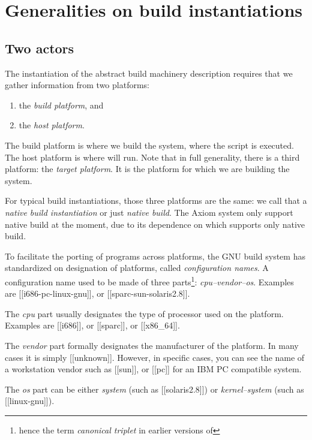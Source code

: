 \documentclass[12pt]{article}
\begin{document}
\section{Generalities on build instantiations}

\subsection{Two actors}

The instantiation of the abstract build machinery description requires
that we gather information from two platforms:
\begin{enumerate}
\item the \emph{build platform}, and
\item the \emph{host platform}.
\end{enumerate}

The build platform is where we build the system, \eg{} where
the  script is executed.  The host platform
is where  will run.  Note that in full generality, there is
a third platform: the \emph{target platform}.  It is the platform for which
we are building the system.

For typical build instantiations, those  three  platforms are the same: we
call that a \emph{native build instantiation} or just \emph{native build}.
The Axiom system only support native build at the moment, due to its
dependence on  which supports only native build.

To facilitate the porting of programs across platforms, the GNU build
system has standardized on designation of platforms, called
\emph{configuration names}.  A configuration name used to be
made of three parts\footnote{hence the term \emph{canonical triplet} in
    earlier versions of }:
\textsl{cpu--vendor--os}.  Examples are
[[i686-pc-linux-gnu]], or [[sparc-sun-solaris2.8]].

The \textsl{cpu}
part usually designates the type of processor used on the platform.
Examples are [[i686]], or [[sparc]], or [[x86_64]].

The \textsl{vendor} part formally designates the manufacturer of
the platform.  In many cases it is simply [[unknown]].  However,
in specific cases, you can see the name of a workstation vendor such
as [[sun]], or [[pc]] for an IBM PC compatible system.

The \textsl{os} part can be either \textsl{system} (such as [[solaris2.8]])
or \textsl{kernel--system} (such as [[linux-gnu]]).
\end{document}
